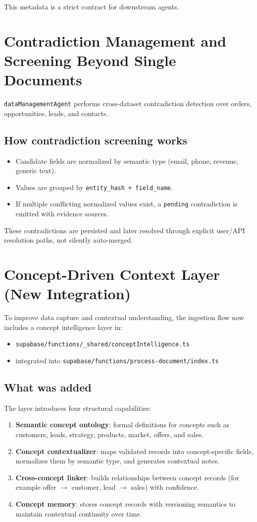 \documentclass[11pt,a4paper]{article}
\begin{document}
This metadata is a strict contract for downstream agents.

\section{Contradiction Management and Screening Beyond Single Documents}
\texttt{dataManagementAgent} performs cross-dataset contradiction detection over orders, opportunities, leads, and contacts.

\subsection{How contradiction screening works}
\begin{itemize}[leftmargin=*]
  \item Candidate fields are normalized by semantic type (email, phone, revenue, generic text).
  \item Values are grouped by \texttt{entity\_hash + field\_name}.
  \item If multiple conflicting normalized values exist, a \texttt{pending} contradiction is emitted with evidence sources.
\end{itemize}

These contradictions are persisted and later resolved through explicit user/API resolution paths, not silently auto-merged.

\section{Concept-Driven Context Layer (New Integration)}
To improve data capture and contextual understanding, the ingestion flow now includes a concept intelligence layer in:
\begin{itemize}[leftmargin=*]
  \item \texttt{supabase/functions/\_shared/conceptIntelligence.ts}
  \item integrated into \texttt{supabase/functions/process-document/index.ts}
\end{itemize}

\subsection{What was added}
The layer introduces four structural capabilities:
\begin{enumerate}[leftmargin=*]
  \item \textbf{Semantic concept ontology}: formal definitions for concepts such as customers, leads, strategy, products, market, offers, and sales.
  \item \textbf{Concept contextualizer}: maps validated records into concept-specific fields, normalizes them by semantic type, and generates contextual notes.
  \item \textbf{Cross-concept linker}: builds relationships between concept records (for example offer $\rightarrow$ customer, lead $\rightarrow$ sales) with confidence.
  \item \textbf{Concept memory}: stores concept records with versioning semantics to maintain contextual continuity over time.
\end{enumerate}
\end{document}
